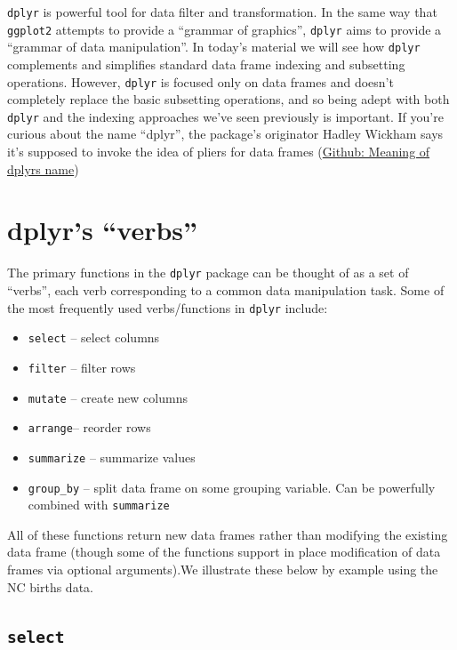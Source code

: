 \documentclass[]{book}
\providecommand{\tightlist}{%
  \setlength{\itemsep}{0pt}\setlength{\parskip}{0pt}}
\theoremstyle{definition}
\theoremstyle{definition}
\theoremstyle{definition}
\theoremstyle{remark}
\begin{document}
\texttt{dplyr} is powerful tool for data filter and transformation. In
the same way that \texttt{ggplot2} attempts to provide a ``grammar of
graphics'', \texttt{dplyr} aims to provide a ``grammar of data
manipulation''. In today's material we will see how \texttt{dplyr}
complements and simplifies standard data frame indexing and subsetting
operations. However, \texttt{dplyr} is focused only on data frames and
doesn't completely replace the basic subsetting operations, and so being
adept with both \texttt{dplyr} and the indexing approaches we've seen
previously is important. If you're curious about the name ``dplyr'', the
package's originator Hadley Wickham says it's supposed to invoke the
idea of pliers for data frames
(\href{https://github.com/tidyverse/dplyr/issues/1857}{Github: Meaning
of dplyrs name})

\hypertarget{dplyrs-verbs}{%
\section{dplyr's ``verbs''}\label{dplyrs-verbs}}

The primary functions in the \texttt{dplyr} package can be thought of as
a set of ``verbs'', each verb corresponding to a common data
manipulation task. Some of the most frequently used verbs/functions in
\texttt{dplyr} include:

\begin{itemize}
\tightlist
\item
  \texttt{select} -- select columns
\item
  \texttt{filter} -- filter rows
\item
  \texttt{mutate} -- create new columns
\item
  \texttt{arrange}-- reorder rows
\item
  \texttt{summarize} -- summarize values
\item
  \texttt{group\_by} -- split data frame on some grouping variable. Can
  be powerfully combined with \texttt{summarize}
\end{itemize}

All of these functions return new data frames rather than modifying the
existing data frame (though some of the functions support in place
modification of data frames via optional arguments).We illustrate these
below by example using the NC births data.

\hypertarget{select}{%
\subsection{\texorpdfstring{\texttt{select}}{select}}\label{select}}
\end{document}
